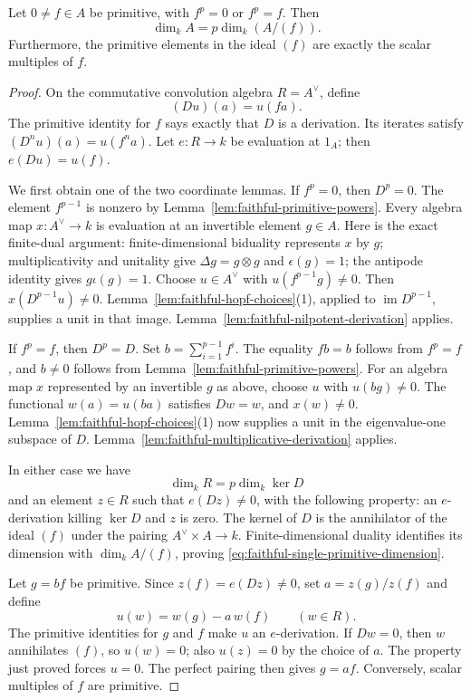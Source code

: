 \begin{srlemma}
\label{lem:faithful-single-primitive-quotient}
Let \(0\ne f\in A\) be primitive, with \(f^p=0\) or \(f^p=f\).
Then
\[
 \dim_k A=p\dim_k(A/(f)).
 \tag{HC3}\label{eq:faithful-single-primitive-dimension}
\]
Furthermore, the primitive elements in the ideal \((f)\) are
exactly the scalar multiples of \(f\).
\end{srlemma}
\begin{proof}
On the commutative convolution algebra \(R=A^\vee\), define
\[
 (Du)(a)=u(fa).
\]
The primitive identity for \(f\) says exactly that \(D\) is a
derivation.  Its iterates satisfy
\((D^nu)(a)=u(f^na)\).  Let \(e:R\to k\) be evaluation at \(1_A\);
then \(e(Du)=u(f)\).

We first obtain one of the two coordinate lemmas.
If \(f^p=0\), then \(D^p=0\).  The element \(f^{p-1}\) is nonzero
by Lemma~\ref{lem:faithful-primitive-powers}.  Every algebra map
\(x:A^\vee\to k\) is evaluation at an invertible element \(g\in A\).
Here is the exact finite-dual argument: finite-dimensional
biduality represents \(x\) by \(g\); multiplicativity and unitality
give \(\Delta g=g\otimes g\) and \(\epsilon(g)=1\); the antipode
identity gives \(g\iota(g)=1\).
Choose \(u\in A^\vee\) with \(u(f^{p-1}g)\ne0\).  Then
\(x(D^{p-1}u)\ne0\).
Lemma~\ref{lem:faithful-hopf-choices}(1), applied to
\(\operatorname{im}D^{p-1}\), supplies a unit in that image.
Lemma~\ref{lem:faithful-nilpotent-derivation} applies.

If \(f^p=f\), then \(D^p=D\).  Set
\(b=\sum_{i=1}^{p-1}f^i\).
The equality \(fb=b\) follows from \(f^p=f\), and \(b\ne0\) follows
from Lemma~\ref{lem:faithful-primitive-powers}.
For an algebra map \(x\) represented by an invertible \(g\) as above,
choose \(u\) with \(u(bg)\ne0\).
The functional \(w(a)=u(ba)\) satisfies \(Dw=w\), and \(x(w)\ne0\).
Lemma~\ref{lem:faithful-hopf-choices}(1) now supplies a unit in
the eigenvalue-one subspace of \(D\).
Lemma~\ref{lem:faithful-multiplicative-derivation} applies.

In either case we have
\[
 \dim_kR=p\dim_k\ker D
 \tag{HC4}\label{eq:faithful-dual-rank}
\]
and an element \(z\in R\) such that \(e(Dz)\ne0\), with the following
property: an \(e\)-derivation killing \(\ker D\) and \(z\) is zero.
The kernel of \(D\) is the annihilator of the ideal \((f)\) under
the pairing \(A^\vee\times A\to k\).  Finite-dimensional duality
identifies its dimension with \(\dim_k A/(f)\), proving
\eqref{eq:faithful-single-primitive-dimension}.

Let \(g=bf\) be primitive.  Since \(z(f)=e(Dz)\ne0\), set
\(a=z(g)/z(f)\) and define
\[
 u(w)=w(g)-a\,w(f)\qquad(w\in R).
\]
The primitive identities for \(g\) and \(f\) make \(u\) an
\(e\)-derivation.  If \(Dw=0\), then \(w\) annihilates \((f)\),
so \(u(w)=0\); also \(u(z)=0\) by the choice of \(a\).
The property just proved forces \(u=0\).
The perfect pairing then gives \(g=af\).
Conversely, scalar multiples of \(f\) are primitive.
\end{proof}

